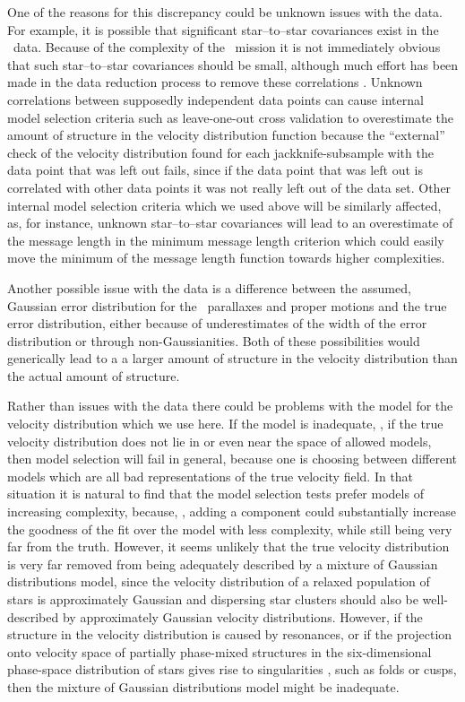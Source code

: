 One of the reasons for this discrepancy could be unknown issues with
the data. For example, it is possible that significant star--to--star
covariances exist in the \Hipparcos\ data. Because of the complexity
of the \Hipparcos\ mission it is not immediately obvious that such
star--to--star covariances should be small, although much effort has
been made in the data reduction process to remove these correlations
\citep[\eg,][]{2007ASSL..250.....V}. Unknown correlations between
supposedly independent data points can cause internal model selection
criteria such as leave-one-out cross validation to overestimate the
amount of structure in the velocity distribution function because the
``external'' check of the velocity distribution found for each
jackknife-subsample with the data point that was left out fails, since
if the data point that was left out is correlated with other data
points it was not really left out of the data set. Other internal
model selection criteria which we used above will be similarly
affected, as, for instance, unknown star--to--star covariances will
lead to an overestimate of the message length in the minimum message
length criterion which could easily move the minimum of the message
length function towards higher complexities.

Another possible issue with the data is a difference between the
assumed, Gaussian error distribution for the \Hipparcos\ parallaxes
and proper motions and the true error distribution, either because of
underestimates of the width of the error distribution or through
non-Gaussianities. Both of these possibilities would generically lead
to a a larger amount of structure in the velocity distribution than
the actual amount of structure. 

Rather than issues with the data there could be problems with the
model for the velocity distribution which we use here. If the model is
inadequate, \ie, if the true velocity distribution does not lie in or
even near the space of allowed models, then model selection will fail
in general, because one is choosing between different models which are
all bad representations of the true velocity field. In that situation
it is natural to find that the model selection tests prefer models of
increasing complexity, because, \eg, adding a component could
substantially increase the goodness of the fit over the model with
less complexity, while still being very far from the truth. However,
it seems unlikely that the true velocity distribution is very far
removed from being adequately described by a mixture of Gaussian
distributions model, since the velocity distribution of a relaxed
population of stars is approximately Gaussian and dispersing star
clusters should also be well-described by approximately Gaussian
velocity distributions. However, if the structure in the velocity
distribution is caused by resonances, or if the projection onto
velocity space of partially phase-mixed structures in the
six-dimensional phase-space distribution of stars gives rise to
singularities \citep{1999MNRAS.307..877T}, such as folds or cusps,
then the mixture of Gaussian distributions model might be inadequate.

